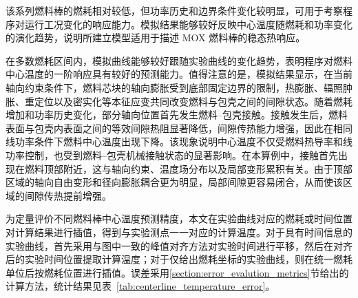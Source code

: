 该系列燃料棒的燃耗相对较低，但功率历史和边界条件变化较明显，可用于考察程序对运行工况变化的响应能力。模拟结果能够较好反映中心温度随燃耗和功率变化的演化趋势，说明所建立模型适用于描述 MOX 燃料棒的稳态热响应。

在多数燃耗区间内，模拟曲线能够较好跟随实验曲线的变化趋势，表明程序对燃料中心温度的一阶响应具有较好的预测能力。值得注意的是，模拟结果显示，在当前轴向约束条件下，燃料芯块的轴向膨胀受到底部固定边界的限制，热膨胀、辐照肿胀、重定位以及密实化等本征应变共同改变燃料与包壳之间的间隙状态。随着燃耗增加和功率历史变化，部分轴向位置首先发生燃料--包壳接触。接触发生后，燃料表面与包壳内表面之间的等效间隙热阻显著降低，间隙传热能力增强，因此在相同线功率条件下燃料中心温度出现下降。该现象说明中心温度不仅受燃料热导率和线功率控制，也受到燃料--包壳机械接触状态的显著影响。在本算例中，接触首先出现在燃料顶部附近，这与轴向约束、温度场分布以及局部变形累积有关。由于顶部区域的轴向自由变形和径向膨胀耦合更为明显，局部间隙更容易闭合，从而使该区域的间隙传热提前增强。

为定量评价不同燃料棒中心温度预测精度，本文在实验曲线对应的燃耗或时间位置对计算结果进行插值，得到与实验测点一一对应的计算温度。对于具有时间信息的实验曲线，首先采用与图中一致的峰值对齐方法对实验时间进行平移，然后在对齐后的实验时间位置提取计算温度；对于仅给出燃耗坐标的实验曲线，则在统一燃耗单位后按燃耗位置进行插值。误差采用\ref{section:error_evalution_metrics}节给出的计算方法，统计结果见表~\ref{tab:centerline_temperature_error}。

